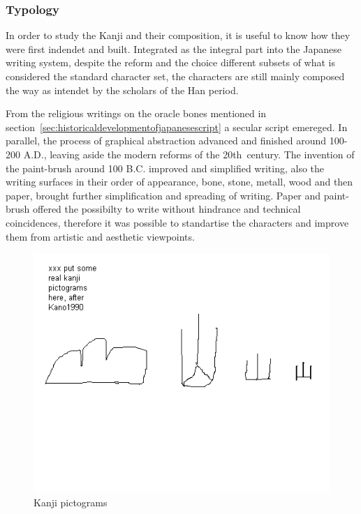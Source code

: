 \subsubsection{Typology}
\label{sec:typologyofthekanji}

In order to study the Kanji and their composition, it is useful to know how they
were first indendet and built. Integrated as the integral part into the Japanese
writing system, despite the reform and the choice different subsets of what is 
considered the standard character set, the characters are still mainly composed
the way as intendet by the scholars of the Han period.

From the religious writings on the oracle bones mentioned in 
section~\ref{sec:historicaldevelopmentofjapanesescript} a secular script 
emereged. In parallel, the process of graphical abstraction advanced and
finished around 100-200 A.D., leaving aside the modern reforms of the 
20th~century. The invention of the paint-brush around 100 B.C. improved and 
simplified writing, also the writing surfaces in their order of appearance,
bone, stone, metall, wood and then paper, brought further simplification and
spreading of writing. Paper and paint-brush offered the possibilty to write
without hindrance and technical coincidences, therefore it was possible to
standartise the characters and improve them from artistic and aesthetic 
viewpoints.

\begin{figure}[htbp]
\includegraphics[scale=0.5]{images/kanjipictograms.png}
\caption{Kanji pictograms}
\label{fig:kanjipictograms}
\end{figure}


